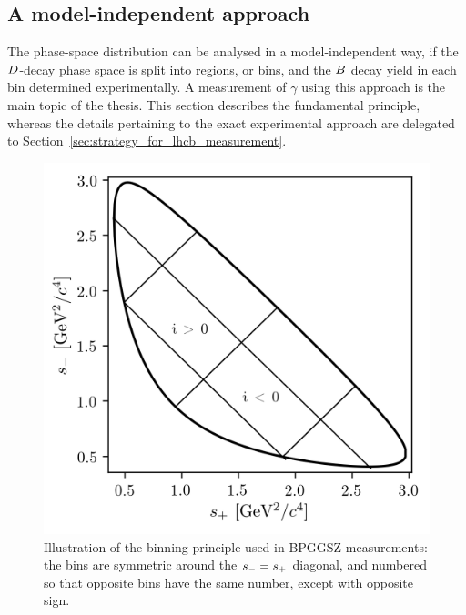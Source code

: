 \subsection{A model-independent approach} %
\label{sub:a_model_independent_approach}


The phase-space distribution can be analysed in a model-independent way, if the ${D}$-decay phase space is split into regions, or bins, and the ${B}$ decay yield in each bin determined experimentally. A measurement of $\gamma$ using this approach is the main topic of the thesis. This section describes the fundamental principle, whereas the details pertaining to the exact experimental approach are delegated to Section~\ref{sec:strategy_for_lhcb_measurement}. 

\begin{figure}[tb]
     \centering
     \includegraphics[width=0.55\columnwidth]{figures/theory/binnings/binning_example.png}
     \caption{Illustration of the binning principle used in BPGGSZ measurements: the bins are symmetric around the $s_-=s_+$ diagonal, and numbered so that opposite bins have the same number, except with opposite sign.}
     \label{fig:GGSZ_bin_principle}
 \end{figure} 

